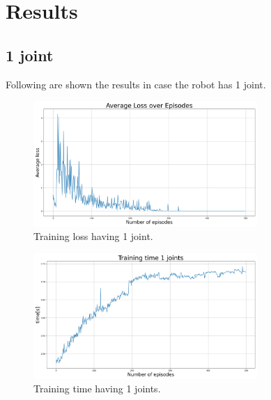 \documentclass[twocolumn, a4paper]{article}
\begin{document}
\section{Results}
\subsection{1 joint}
Following are shown the results in case the robot has 1 joint.

\label{fig:TrainLoss1}
\begin{figure}[H]
	\centering
	\includegraphics[width=8.5cm]{"../Figures/average_loss_over_epiodes_1J_500E_256EL.png"}
	\caption{Training loss having 1 joint.}
\end{figure}
\vspace{-1cm}
\label{fig:TrainTime1}
\begin{figure}[H]
	\centering
	\includegraphics[width=8.5cm]{"../Figures/training_time_over_epiodes_1J_500E_256EL.png"}
	\caption{Training time having 1 joints.}
\end{figure}
\end{document}

